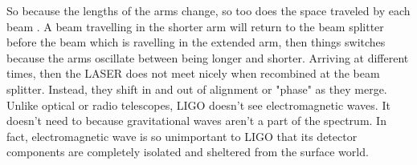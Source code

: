 So because the lengths of the arms change, so too does the space traveled by each beam . A beam travelling in the shorter arm will return to the beam splitter before the beam which is ravelling in the extended arm, then things switches because the arms oscillate between being longer and shorter. Arriving at different times, then the LASER does not meet nicely when recombined at the beam splitter. Instead, they shift in and out of alignment or "phase" as they merge. Unlike optical or radio telescopes, LIGO doesn't see electromagnetic waves. It doesn't need to because gravitational waves aren't a part of the spectrum. In fact, electromagnetic wave is so unimportant to LIGO that its detector components are completely isolated and sheltered from the surface world.

\pagebreak
